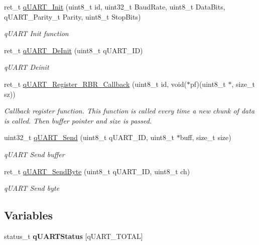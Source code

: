 \begin{DoxyCompactItemize}
\item 
ret\-\_\-t \hyperlink{group___u_a_r_t_gae4f847d89b6ef008c270898c463945c8}{q\-U\-A\-R\-T\-\_\-\-Init} (uint8\-\_\-t id, uint32\-\_\-t \-Baud\-Rate, uint8\-\_\-t \-Data\-Bits, q\-U\-A\-R\-T\-\_\-\-Parity\-\_\-t \-Parity, uint8\-\_\-t \-Stop\-Bits)
\begin{DoxyCompactList}\small\item\em q\-U\-A\-R\-T \-Init function \end{DoxyCompactList}\item 
ret\-\_\-t \hyperlink{group___u_a_r_t_gaed31fc6f6dc66b4791def00e7cbeb33b}{q\-U\-A\-R\-T\-\_\-\-De\-Init} (uint8\-\_\-t q\-U\-A\-R\-T\-\_\-\-I\-D)
\begin{DoxyCompactList}\small\item\em q\-U\-A\-R\-T \-Deinit \end{DoxyCompactList}\item 
ret\-\_\-t \hyperlink{group___u_a_r_t_ga77a138553de092a41d720ceea264bb4c}{q\-U\-A\-R\-T\-\_\-\-Register\-\_\-\-R\-B\-R\-\_\-\-Callback} (uint8\-\_\-t id, void($\ast$pf)(uint8\-\_\-t $\ast$, size\-\_\-t sz))
\begin{DoxyCompactList}\small\item\em \-Callback register function. \-This function is called every time a new chunk of data is called. \-Then buffer pointer and size is passed. \end{DoxyCompactList}\item 
uint32\-\_\-t \hyperlink{group___u_a_r_t_ga8b2eab773713b4d11bba6213c1855e41}{q\-U\-A\-R\-T\-\_\-\-Send} (uint8\-\_\-t q\-U\-A\-R\-T\-\_\-\-I\-D, uint8\-\_\-t $\ast$buff, size\-\_\-t size)
\begin{DoxyCompactList}\small\item\em q\-U\-A\-R\-T \-Send buffer \end{DoxyCompactList}\item 
ret\-\_\-t \hyperlink{group___u_a_r_t_ga4152cf505b9a08b80fc80c6e10d1e872}{q\-U\-A\-R\-T\-\_\-\-Send\-Byte} (uint8\-\_\-t q\-U\-A\-R\-T\-\_\-\-I\-D, uint8\-\_\-t ch)
\begin{DoxyCompactList}\small\item\em q\-U\-A\-R\-T \-Send byte \end{DoxyCompactList}\end{DoxyCompactItemize}
\subsection*{\-Variables}
\begin{DoxyCompactItemize}
\item 
\hypertarget{group___u_a_r_t_gaf42ff9b2e6dca6f02d6d33c13fd384e5}{status\-\_\-t {\bfseries q\-U\-A\-R\-T\-Status} \mbox{[}q\-U\-A\-R\-T\-\_\-\-T\-O\-T\-A\-L\mbox{]}}\label{group___u_a_r_t_gaf42ff9b2e6dca6f02d6d33c13fd384e5}

\end{DoxyCompactItemize}


